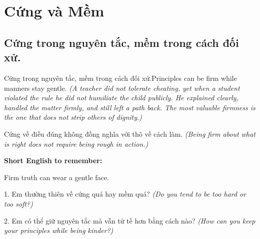 \chapter{Cứng và Mềm}

\section{Cứng trong nguyên tắc, mềm trong cách đối xử.}
\begin{truyen}{Cứng trong nguyên tắc, mềm trong cách đối xử.}{Principles can be firm while manners stay gentle.}
\textit{(A teacher did not tolerate cheating, yet when a student violated the rule he did not humiliate the child publicly. He explained clearly, handled the matter firmly, and still left a path back. The most valuable firmness is the one that does not strip others of dignity.)}
\end{truyen}
\begin{baihoc}
Cứng về điều đúng không đồng nghĩa với thô về cách làm.
\textit{(Being firm about what is right does not require being rough in action.)}
\end{baihoc}
\begin{ghinhoanh}
\textbf{Short English to remember:}

Firm truth can wear a gentle face.
\end{ghinhoanh}
\begin{tuhocnhanh}
1. Em thường thiên về cứng quá hay mềm quá? \textit{(Do you tend to be too hard or too soft?)}

2. Em có thể giữ nguyên tắc mà vẫn tử tế hơn bằng cách nào? \textit{(How can you keep your principles while being kinder?)}
\end{tuhocnhanh}
\ngancach

